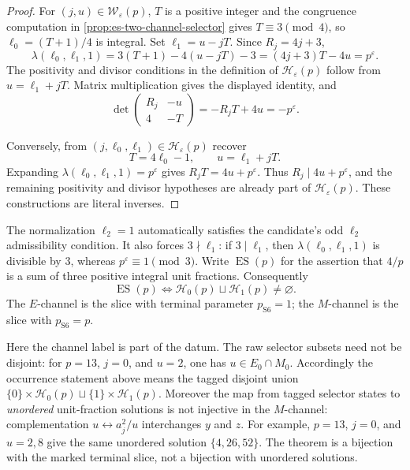 \begin{proof}
For \((j,u)\in\mathcal W_\varepsilon(p)\), \(T\) is a positive integer and
the congruence computation in \cref{prop:es-two-channel-selector} gives
\(T\equiv3\pmod4\), so \(\ell_0=(T+1)/4\) is integral.  Set
\(\ell_1=u-jT\).  Since \(R_j=4j+3\),
\[
 \lambda(\ell_0,\ell_1,1)
 =3(T+1)-4(u-jT)-3
 =(4j+3)T-4u=p^\varepsilon.
\]
The positivity and divisor conditions in the definition of
\(\mathcal H_\varepsilon(p)\) follow from \(u=\ell_1+jT\).  Matrix
multiplication gives the displayed identity, and
\[
 \det\begin{pmatrix}R_j&-u\\4&-T\end{pmatrix}
 =-R_jT+4u=-p^\varepsilon.
\]

Conversely, from \((j,\ell_0,\ell_1)\in\mathcal H_\varepsilon(p)\) recover
\[
 T=4\ell_0-1,
 \qquad u=\ell_1+jT.
\]
Expanding \(\lambda(\ell_0,\ell_1,1)=p^\varepsilon\) gives
\(R_jT=4u+p^\varepsilon\).  Thus \(R_j\mid4u+p^\varepsilon\), and the
remaining positivity and divisor hypotheses are already part of
\(\mathcal H_\varepsilon(p)\).  These constructions are literal inverses.
\end{proof}

The normalization \(\ell_2=1\) automatically satisfies the candidate's odd
\(\ell_2\) admissibility condition.  It also forces \(3\nmid\ell_1\): if
\(3\mid\ell_1\), then \(\lambda(\ell_0,\ell_1,1)\) is divisible by \(3\),
whereas \(p^\varepsilon\equiv1\pmod3\).  Write
\(\operatorname{ES}(p)\) for the assertion that \(4/p\) is a sum of three
positive integral unit fractions.  Consequently
\[
 \operatorname{ES}(p)
 \Longleftrightarrow
 \mathcal H_0(p)\sqcup\mathcal H_1(p)\ne\varnothing.
\]
The \(E\)-channel is the slice with terminal parameter
\(p_{\mathrm{S6}}=1\); the \(M\)-channel is the slice with
\(p_{\mathrm{S6}}=p\).

Here the channel label is part of the datum.  The raw selector subsets need
not be disjoint: for \(p=13\), \(j=0\), and \(u=2\), one has
\(u\in E_0\cap M_0\).  Accordingly the occurrence statement above means the
tagged disjoint union
\(\{0\}\times\mathcal H_0(p)\sqcup\{1\}\times\mathcal H_1(p)\).
Moreover the map from tagged selector states to \emph{unordered} unit-fraction
solutions is not injective in the \(M\)-channel: complementation
\(u\leftrightarrow a_j^2/u\) interchanges \(y\) and \(z\).  For example,
\(p=13\), \(j=0\), and \(u=2,8\) give the same unordered solution
\(\{4,26,52\}\).  The theorem is a bijection with the marked terminal slice,
not a bijection with unordered solutions.


